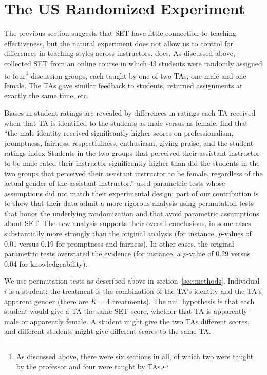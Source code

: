 \documentclass[12pt]{article}
\begin{document}
\section{The US Randomized Experiment} \label{sec:US-results}

The previous section suggests that SET have little
connection to teaching effectiveness, but the natural experiment 
does not allow us to control for differences in teaching 
styles across instructors. 
\citet{MacNell2014} does.
As discussed above,  \citet{MacNell2014}
collected SET from an online course in which 
43 students were randomly assigned to four\footnote{%
   As discussed above, there were six sections in all, of which two 
   were taught by the professor and four
   were taught by TAs.
} 
discussion groups, each taught by one of two TAs, one male and one female. 
The TAs gave similar feedback to students, returned assignments at exactly the same time, etc.

Biases in student ratings are revealed by differences in ratings each TA received
when that TA is identified to the students as male versus as female.
\citet{MacNell2014} find that ``the male identity received significantly higher scores on 
professionalism, promptness, fairness, respectfulness, enthusiasm, giving praise, and the
student ratings index \textellipsis 
Students in the two groups that perceived their assistant
instructor to be male rated their instructor significantly higher than did the students in the
two groups that perceived their assistant instructor to be female, regardless of the actual gender
of the assistant instructor.'' 
\citet{MacNell2014} used parametric tests whose assumptions did not match their experimental
design; part of our contribution is to show that their data admit a more rigorous analysis
using permutation tests that honor the underlying randomization and that avoid parametric
assumptions about SET. 
The new analysis supports their overall conclusions, in some cases substantially more strongly 
than the original analysis (for instance, $p$-values of 0.01 versus 0.19 for promptness and fairness).
In other cases, the original parametric tests overstated the evidence
(for instance, a $p$-value of 0.29 versus 0.04 for knowledgeability).

We use permutation tests as described above in section~\ref{sec:methods}.
Individual $i$ is a student; the treatment is the combination of the TA's identity and the TA's
apparent gender (there are $K=4$ treatments).
The null hypothesis is that each student would give a TA the same SET score,
whether that TA is apparently male or apparently female.
A student might give the two TAs different scores,
and different students might give different scores to the same TA. 
\end{document}
